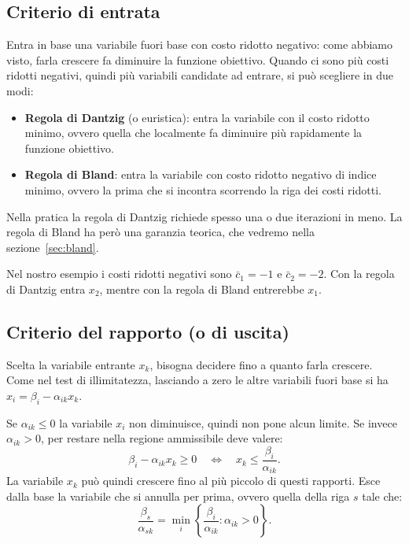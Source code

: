 \subsection{Criterio di entrata}
Entra in base una variabile fuori base con costo ridotto negativo: come abbiamo visto, farla crescere fa diminuire la funzione obiettivo. Quando ci sono più costi ridotti negativi, quindi più variabili candidate ad entrare, si può scegliere in due modi:
\begin{itemize}
    \item \textbf{Regola di Dantzig} (o euristica): entra la variabile con il costo ridotto minimo, ovvero quella che localmente fa diminuire più rapidamente la funzione obiettivo.
    \item \textbf{Regola di Bland}: entra la variabile con costo ridotto negativo di indice minimo, ovvero la prima che si incontra scorrendo la riga dei costi ridotti.
\end{itemize}
Nella pratica la regola di Dantzig richiede spesso una o due iterazioni in meno. La regola di Bland ha però una garanzia teorica, che vedremo nella sezione~\ref{sec:bland}.

Nel nostro esempio i costi ridotti negativi sono $\bar{c}_1 = -1$ e $\bar{c}_2 = -2$. Con la regola di Dantzig entra $x_2$, mentre con la regola di Bland entrerebbe $x_1$.

\subsection{Criterio del rapporto (o di uscita)}
Scelta la variabile entrante $x_k$, bisogna decidere fino a quanto farla crescere. Come nel test di illimitatezza, lasciando a zero le altre variabili fuori base si ha $x_i = \beta_i - \alpha_{ik} x_k$.

Se $\alpha_{ik} \le 0$ la variabile $x_i$ non diminuisce, quindi non pone alcun limite. Se invece $\alpha_{ik} > 0$, per restare nella regione ammissibile deve valere:
\[
\beta_i - \alpha_{ik} x_k \ge 0 \quad\Longleftrightarrow\quad x_k \le \frac{\beta_i}{\alpha_{ik}}.
\]
La variabile $x_k$ può quindi crescere fino al più piccolo di questi rapporti. Esce dalla base la variabile che si annulla per prima, ovvero quella della riga $s$ tale che:
\begin{equation}\label{eq:rapporto}
\frac{\beta_s}{\alpha_{sk}} = \min_{i} \left\{ \frac{\beta_i}{\alpha_{ik}} : \alpha_{ik} > 0 \right\}.
\end{equation}

